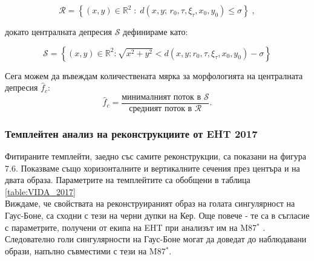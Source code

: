 \begin{equation}
	\mathcal{R}=\left\lbrace
	(x,y)\in\mathbb{R}^2\;:\;d(x,y;\,r_0,\tau,\xi_\tau,x_0,y_0)\leqslant\sigma\right\rbrace\;,
\end{equation}

докато централната депресия $\mathcal{S}$ дефинираме като:

\begin{equation}
	\mathcal{S} = \left\lbrace (x,y)\in\mathbb{R}^2: \sqrt{x^2 + y^2} < d(x,y;r_0,\tau,\xi_\tau,x_0,y_0) - \sigma\right\rbrace
\end{equation}

Сега можем да въвеждам количествената мярка за морфологията на централната депресия $\hat{f}_c$:
\begin{equation}
	\hat{f}_c = \frac{\text{минималният поток в }\mathcal{S}}{\text{средният поток в }\mathcal{R}}.
\end{equation}

\subsubsection{Темплейтен анализ на реконструкциите от EHT 2017}

Фитираните темплейти, заедно със самите реконструкции, са показани на фигура 7.6. Показваме също хоризонталните и вертикалните сечения през центъра и на двата образа. Параметрите на темплейтите са обобщени в таблица \ref{table:VIDA_2017}\\

Виждаме, че свойствата на реконструираният образ на голата сингулярност на Гаус-Боне, са сходни с тези на черни дупки на Кер. Още повече - те са в съгласие с параметрите, получени от екипа на EHT при анализът им на M87$^*$ \cite{EHT_M87_VI}. Следователно голи сингулярности на Гаус-Боне могат да доведат до наблюдавани образи, напълно съвместими с тези на M87$^*$.\\

